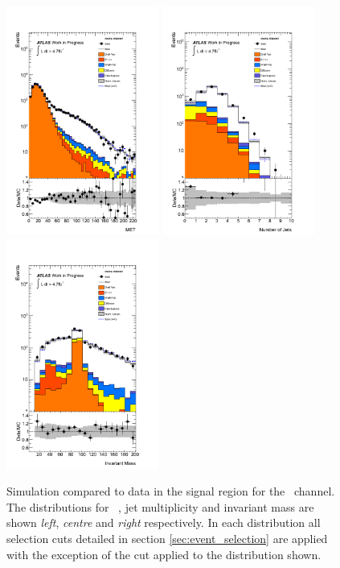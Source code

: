 \begin{figure}[htbp!]
     \begin{center}
     \includegraphics[width=50mm]{f/mumu_control_sig_met_central_double}
     \includegraphics[width=50mm]{f/mumu_control_sig_njet_central_double}
     \includegraphics[width=50mm]{f/mumu_inv_mass_central_double}
     \end{center}
     \caption{Simulation compared to data in the signal region for the \mumu\ channel. The distributions for \etmiss\ , jet multiplicity and invariant mass are shown \emph{left}, \emph{centre} and \emph{right} respectively. In each distribution all selection cuts detailed in section \ref{sec:event_selection} are applied with the exception of the cut applied to the distribution shown.}
     \label{fig:dilep_control_sig_mumu}
    \end{figure}

